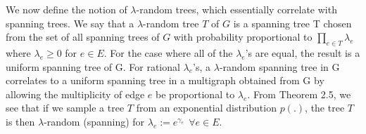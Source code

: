 \documentclass[oneside]{projectpaper} %
\begin{document}
\indent We now define the notion of $\lambda$-random trees, which essentially correlate with spanning trees. We say that a $\lambda$-random tree $T$ of $G$ is a spanning tree T chosen from the set of all spanning trees of $G$ with probability proportional to $\prod\limits_{e \in T}\lambda_e$ where $\lambda_e \geq 0$ for $e \in E$. For the case where all of the $\lambda_e$'s are equal, the result is a uniform spanning tree of G. For rational $\lambda_e$'s, a $\lambda$-random spanning tree in G correlates to a uniform spanning tree in a multigraph obtained from G by allowing the multiplicity of edge $e$ be proportional to $\lambda_e$. From Theorem 2.5, we see that if we sample a tree $T$ from an exponential distribution $p(.)$, the tree $T$ is then $\lambda$-random (spanning) for $\lambda_e := e^{\gamma_e} \ \ \forall e \in E$.


\end{document}
